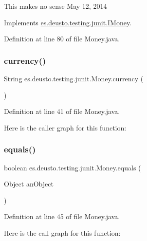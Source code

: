 This makes no sense May 12, 2014 

Implements \mbox{\hyperlink{interfacees_1_1deusto_1_1testing_1_1junit_1_1_i_money_ae45bc758e69a0017f083f11d050c53cb}{es.\+deusto.\+testing.\+junit.\+I\+Money}}.



Definition at line 80 of file Money.\+java.

\mbox{\label{classes_1_1deusto_1_1testing_1_1junit_1_1_money_aefa4aaf62bb653eae25851d98ae02dcb}} 
\subsubsection{\texorpdfstring{currency()}{currency()}}
{\footnotesize\ttfamily String es.\+deusto.\+testing.\+junit.\+Money.\+currency (\begin{DoxyParamCaption}{ }\end{DoxyParamCaption})}



Definition at line 41 of file Money.\+java.

Here is the caller graph for this function\+:
\mbox{\label{classes_1_1deusto_1_1testing_1_1junit_1_1_money_a2356df38b8e9ecdd969bab11d6dd301b}} 
\subsubsection{\texorpdfstring{equals()}{equals()}}
{\footnotesize\ttfamily boolean es.\+deusto.\+testing.\+junit.\+Money.\+equals (\begin{DoxyParamCaption}\item[{Object}]{an\+Object }\end{DoxyParamCaption})}



Definition at line 45 of file Money.\+java.

Here is the call graph for this function\+:
\mbox{\label{classes_1_1deusto_1_1testing_1_1junit_1_1_money_af6cfb5b27bf97170d990dea12de04f37}} 
